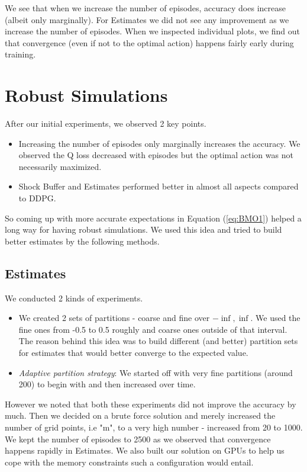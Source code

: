 We see that when we increase the number of episodes, accuracy does increase (albeit only marginally). For Estimates we did not see any improvement as we increase the number of episodes. When we inspected individual plots, we find out that convergence (even if not to the optimal action) happens fairly early during training. 


\section{Robust Simulations} \label{section:rs}



After our initial experiments, we observed 2 key points.
\begin{itemize}
    \item Increasing the number of episodes only marginally increases the accuracy. We observed the Q loss decreased with episodes but the optimal action was not necessarily maximized.
    \item Shock Buffer and Estimates  performed better in almost all aspects compared to DDPG.
\end{itemize}
So coming up with more accurate expectations in Equation (\ref{eq:BMO1}) helped a long way for having robust simulations. We used this idea and tried to build better estimates by the following methods.

\subsection{Estimates}
We conducted 2 kinds of experiments. 
\begin{itemize}
\item
We created 2 sets of partitions -  coarse and fine over $-\inf,\inf$. We used the fine ones from -0.5 to 0.5 roughly and coarse ones outside of that interval. The reason behind this idea was to build different (and better) partition sets for estimates that would better converge to the expected value. 
\item
\textit{Adaptive partition strategy}: We started  off with very fine partitions (around 200) to begin with and then increased over time.
\end{itemize}
However we noted that both these experiments did not improve the accuracy by much. Then we decided on a brute force solution and merely increased the number of grid points, i.e "m", to a very high number - increased from 20 to 1000. We kept the number of episodes to 2500 as we observed that convergence happens rapidly in Estimates. We also built our solution on GPUs to help us cope with the memory constraints such a configuration would entail.

